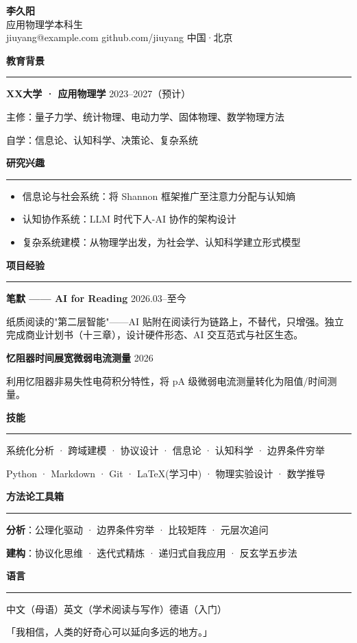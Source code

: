 \documentclass[12pt,a4paper]{ctexart}
\newcommand{\cvsection}[1]{
  \vspace{0.8em}
  \noindent
  {\color{primary}\large\textbf{#1}}
  \vspace{0.15em}
  \hrule
  \vspace{0.5em}
}
\begin{document}
\begin{center}
  {\color{primary}\huge\textbf{李久阳}} \\[0.3em]
  {\large 应用物理学本科生} \\[0.4em]
  {\color{gray}\small jiuyang@example.com \quad github.com/jiuyang \quad 中国·北京}
\end{center}

\cvsection{教育背景}
\textbf{XX大学 · 应用物理学} \hfill 2023--2027（预计）

主修：量子力学、统计物理、电动力学、固体物理、数学物理方法

自学：信息论、认知科学、决策论、复杂系统

\cvsection{研究兴趣}
\begin{itemize}
  \item 信息论与社会系统：将 Shannon 框架推广至注意力分配与认知熵
  \item 认知协作系统：LLM 时代下人-AI 协作的架构设计
  \item 复杂系统建模：从物理学出发，为社会学、认知科学建立形式模型
\end{itemize}

\cvsection{项目经验}
\textbf{笔默 —— AI for Reading} \hfill 2026.03--至今

纸质阅读的"第二层智能"——AI 贴附在阅读行为链路上，不替代，只增强。独立完成商业计划书（十三章），设计硬件形态、AI 交互范式与社区生态。

\textbf{忆阻器时间展宽微弱电流测量} \hfill 2026

利用忆阻器非易失性电荷积分特性，将 pA 级微弱电流测量转化为阻值/时间测量。

\cvsection{技能}
系统化分析 · 跨域建模 · 协议设计 · 信息论 · 认知科学 · 边界条件穷举

Python · Markdown · Git · LaTeX(学习中) · 物理实验设计 · 数学推导

\cvsection{方法论工具箱}
\textbf{分析}：公理化驱动 · 边界条件穷举 · 比较矩阵 · 元层次追问

\textbf{建构}：协议化思维 · 迭代式精炼 · 递归式自我应用 · 反玄学五步法

\cvsection{语言}
中文（母语）\hfill 英文（学术阅读与写作）\hfill 德语（入门）

\vspace{1em}
\begin{center}
  {\color{gray}\footnotesize 「我相信，人类的好奇心可以延向多远的地方。」}
\end{center}
\end{document}
